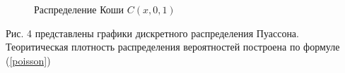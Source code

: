\documentclass[12pt]{article}
\begin{document}
\begin{flushleft}
\begin{figure}[h!]
\begin{minipage}[h]{0.325\linewidth}
        \end{minipage}
        \caption{Распределение Коши $C(x, 0, 1)$}
    \end{figure}

    \newpage

     Рис. 4 представлены графики дискретного распределения Пуассона. Теоритическая плотность распределения вероятностей построена по формуле (\ref{poisson})

    \begin{figure}[h!]
        \begin{minipage}[h]{0.325\linewidth}
        \end{minipage}
        \begin{minipage}[h]{0.325\linewidth}
        \end{minipage}

\end{figure}
\end{flushleft}
\end{document}
